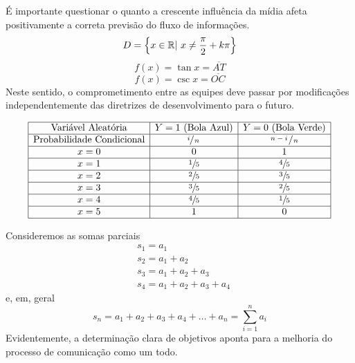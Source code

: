 \documentclass[fleqn]{profmat-cefet}
\begin{document}
É importante questionar o quanto a crescente influência da mídia afeta
positivamente a correta previsão do fluxo de informações. 
\[
    D=\left\{x \in \mathbb{R} |\ x\neq \frac{\pi}{2} + k\pi\right\} 
\]
\[
    f(x) = \tan x = \overline{AT}
\]
\[
    f(x) = \csc x = \overline{OC}
\]
Neste sentido, o
comprometimento entre as equipes deve passar por modificações independentemente
das diretrizes de desenvolvimento para o futuro. 
\begin{ceqn} %
\[
\begin{array}{|c|c|c|}
        \hline
           \text{Variável Aleatória}     & Y=1 \text{ (Bola Azul)} & Y=0 \text{ (Bola Verde)} \\ \hline
        \text{Probabilidade Condicional} &    \sfrac{i}{\,n\,}     &  \sfrac{\,n-i\,}{\,n\,}  \\ \hline
                      x=0                &            0            &            1             \\ \hline
                      x=1                &      \sfrac{1}{5}       &       \sfrac{4}{5}       \\ \hline
                      x=2                &      \sfrac{2}{5}       &       \sfrac{3}{5}       \\ \hline
                      x=3                &      \sfrac{3}{5}       &       \sfrac{2}{5}       \\ \hline
                      x=4                &      \sfrac{4}{5}       &       \sfrac{1}{5}       \\ \hline
                      x=5                &            1            &            0             \\ \hline
\end{array}
\]
\end{ceqn}

Consideremos as somas parciais
\begin{align*}
         & s_1 = a_1                   \\
         & s_2 = a_1 + a_2             \\
         & s_3 = a_1 + a_2 + a_3       \\
         & s_4 = a_1 + a_2 + a_3 + a_4
\end{align*}
e, em, geral
\[
    s_n = a_1 + a_2 + a_3 + a_4 + \dots + a_n 
        = \sum_{i=1}^{n} a_i 
\]
Evidentemente, a determinação
clara de objetivos aponta para a melhoria do processo de comunicação como um
todo. 
\end{document}
